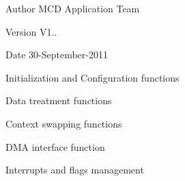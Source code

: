 \begin{DoxyAuthor}{Author}
M\+CD Application Team 
\end{DoxyAuthor}
\begin{DoxyVersion}{Version}
V1.. 
\end{DoxyVersion}
\begin{DoxyDate}{Date}
30-\/\+September-\/2011
\begin{DoxyItemize}
\item Initialization and Configuration functions
\item Data treatment functions
\item Context swapping functions
\item D\+MA interface function
\item Interrupts and flags management
\end{DoxyItemize}
\end{DoxyDate}
